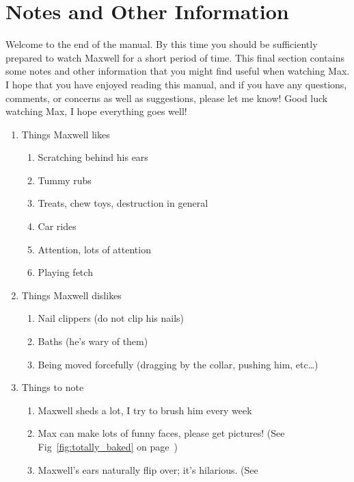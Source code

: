 \documentclass[pdftex,12pt]{article}
\begin{document}
\newpage
\section{Notes and Other Information}

Welcome to the end of the manual. By this time you should be sufficiently
prepared to watch Maxwell for a short period of time. This final section
contains some notes and other information that you might find useful when
watching Max. I hope that you have enjoyed reading this manual, and if you have
any questions, comments, or concerns as well as suggestions, please let me know!
Good luck watching Max, I hope everything goes well!

\bigskip

\begin{enumerate}\label{itm:other_information}
    \item Things Maxwell likes
        \begin{enumerate}
            \item Scratching behind his ears
            \item Tummy rubs
            \item Treats, chew toys, destruction in general
            \item Car rides
            \item Attention, lots of attention
            \item Playing fetch
        \end{enumerate}
    \item Things Maxwell dislikes
        \begin{enumerate}
            \item Nail clippers (do not clip his nails)
            \item Baths (he's wary of them)
            \item Being moved forcefully (dragging by the collar, pushing him,
                etc\ldots)
        \end{enumerate}
    \item Things to note
        \begin{enumerate}
            \item Maxwell sheds a lot, I try to brush him every week
            \item Max can make lots of funny faces, please get pictures! (See
                Fig~\ref{fig:totally_baked} on page~\pageref{fig:totally_baked})
            \item Maxwell's ears naturally flip over; it's hilarious. (See

\end{enumerate}
\end{enumerate}
\end{document}
